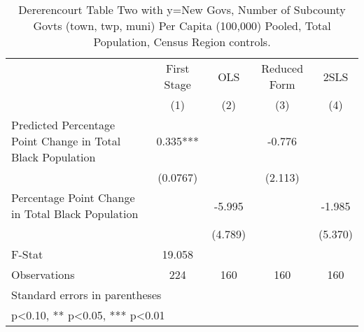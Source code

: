 \begin{table}[htbp]\centering
\def\sym#1{\ifmmode^{#1}\else\(^{#1}\)\fi}
\caption{Dererencourt Table Two with y=New Govs, Number of Subcounty Govts (town, twp, muni) Per Capita (100,000) Pooled, Total Population, Census Region controls.}
\begin{tabular}{l*{4}{c}}
\toprule
                    & First Stage   &         OLS   &Reduced Form   &        2SLS   \\
                    &\multicolumn{1}{c}{(1)}   &\multicolumn{1}{c}{(2)}   &\multicolumn{1}{c}{(3)}   &\multicolumn{1}{c}{(4)}   \\
\midrule
Predicted Percentage Point Change in Total Black Population&       0.335***&               &      -0.776   &               \\
                    &    (0.0767)   &               &     (2.113)   &               \\
\addlinespace
Percentage Point Change in Total Black Population&               &      -5.995   &               &      -1.985   \\
                    &               &     (4.789)   &               &     (5.370)   \\
\midrule
F-Stat              &      19.058   &               &               &               \\
Observations        &         224   &         160   &         160   &         160   \\
\bottomrule
\multicolumn{5}{l}{\footnotesize Standard errors in parentheses}\\
\multicolumn{5}{l}{\footnotesize * p<0.10, ** p<0.05, *** p<0.01}\\
\end{tabular}
\end{table}
